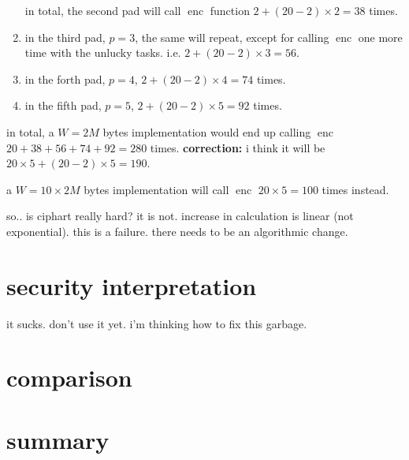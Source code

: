 \documentclass{article}
\DeclareMathOperator{\enc}{enc}
\begin{document}
\begin{multicols}{2}
\begin{enumerate}
        in total, the second pad will call $\enc$ function $2 + (20-2)
        \times 2 = 38$ times.
    \item in the third pad, $p=3$, the same will repeat, except for calling
    $\enc$ one more time with the unlucky tasks.  i.e. $2 + (20-2) \times 3
    = 56$.
    \item in the forth pad, $p=4$, $2 + (20-2) \times 4 = 74$ times.
    \item in the fifth pad, $p=5$, $2 + (20-2) \times 5 = 92$ times.
\end{enumerate}

in total, a $W=2M$ bytes implementation would end up calling $\enc$ $20 +
38 + 56 + 74 + 92 = 280$ times.  \textbf{correction:}  i think it will be
$20\times 5 + (20-2) \times 5 = 190$.

a $W=10 \times 2M$ bytes implementation will call $\enc$ $20 \times 5 =
100$ times instead.

so.. is ciphart really hard?  it is not.  increase in calculation is linear
(not exponential).  this is a failure.  there needs to be an algorithmic
change.

\section{security interpretation}
it sucks.  don't use it yet.  i'm thinking how to fix this garbage.

\section{comparison}
\section{summary}

\end{multicols}
\end{document}
